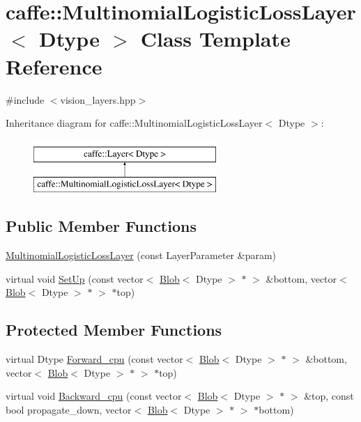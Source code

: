 \hypertarget{classcaffe_1_1_multinomial_logistic_loss_layer}{\section{caffe\+:\+:Multinomial\+Logistic\+Loss\+Layer$<$ Dtype $>$ Class Template Reference}
\label{classcaffe_1_1_multinomial_logistic_loss_layer}
}


{\ttfamily \#include $<$vision\+\_\+layers.\+hpp$>$}

Inheritance diagram for caffe\+:\+:Multinomial\+Logistic\+Loss\+Layer$<$ Dtype $>$\+:\begin{figure}[H]
\begin{center}
\leavevmode
\includegraphics[height=2.000000cm]{classcaffe_1_1_multinomial_logistic_loss_layer}
\end{center}
\end{figure}
\subsection*{Public Member Functions}
\begin{DoxyCompactItemize}
\item 
\hyperlink{classcaffe_1_1_multinomial_logistic_loss_layer_a1c9567f9901885ec4737cf9315d52081}{Multinomial\+Logistic\+Loss\+Layer} (const Layer\+Parameter \&param)
\item 
virtual void \hyperlink{classcaffe_1_1_multinomial_logistic_loss_layer_af706bf27c3170a243660e7fe46ad0686}{Set\+Up} (const vector$<$ \hyperlink{classcaffe_1_1_blob}{Blob}$<$ Dtype $>$ $\ast$ $>$ \&bottom, vector$<$ \hyperlink{classcaffe_1_1_blob}{Blob}$<$ Dtype $>$ $\ast$ $>$ $\ast$top)
\end{DoxyCompactItemize}
\subsection*{Protected Member Functions}
\begin{DoxyCompactItemize}
\item 
virtual Dtype \hyperlink{classcaffe_1_1_multinomial_logistic_loss_layer_a5c506ead552d2764df152dd9c90b768b}{Forward\+\_\+cpu} (const vector$<$ \hyperlink{classcaffe_1_1_blob}{Blob}$<$ Dtype $>$ $\ast$ $>$ \&bottom, vector$<$ \hyperlink{classcaffe_1_1_blob}{Blob}$<$ Dtype $>$ $\ast$ $>$ $\ast$top)
\item 
virtual void \hyperlink{classcaffe_1_1_multinomial_logistic_loss_layer_a130cef8084d30fc789c401ec0310d587}{Backward\+\_\+cpu} (const vector$<$ \hyperlink{classcaffe_1_1_blob}{Blob}$<$ Dtype $>$ $\ast$ $>$ \&top, const bool propagate\+\_\+down, vector$<$ \hyperlink{classcaffe_1_1_blob}{Blob}$<$ Dtype $>$ $\ast$ $>$ $\ast$bottom)
\end{DoxyCompactItemize}
